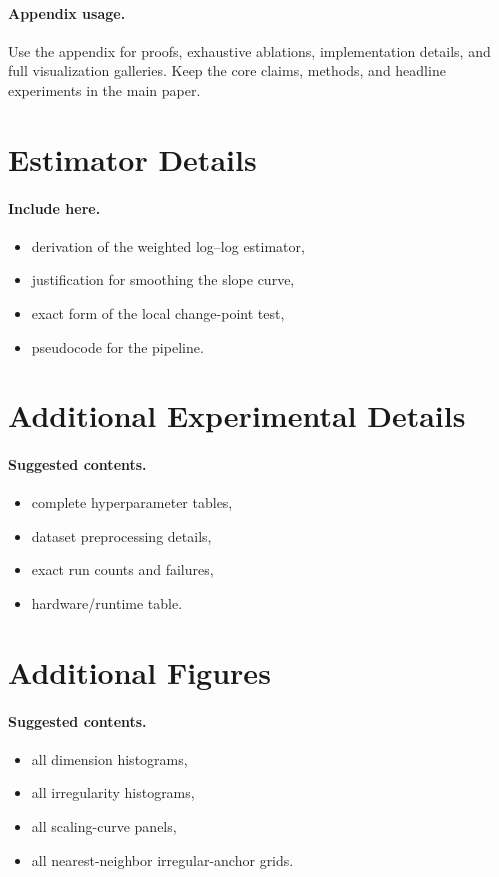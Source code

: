 \documentclass{article}
\theoremstyle{definition}
\theoremstyle{plain}
\theoremstyle{remark}
\begin{document}
\appendix

\paragraph{Appendix usage.}
Use the appendix for proofs, exhaustive ablations, implementation details, and full visualization galleries. Keep the core claims, methods, and headline experiments in the main paper.

\section{Estimator Details}
\paragraph{Include here.}
\begin{itemize}[leftmargin=1.5em]
\item derivation of the weighted log--log estimator,
\item justification for smoothing the slope curve,
\item exact form of the local change-point test,
\item pseudocode for the pipeline.
\end{itemize}

\section{Additional Experimental Details}
\paragraph{Suggested contents.}
\begin{itemize}[leftmargin=1.5em]
\item complete hyperparameter tables,
\item dataset preprocessing details,
\item exact run counts and failures,
\item hardware/runtime table.
\end{itemize}

\section{Additional Figures}
\paragraph{Suggested contents.}
\begin{itemize}[leftmargin=1.5em]
\item all dimension histograms,
\item all irregularity histograms,
\item all scaling-curve panels,
\item all nearest-neighbor irregular-anchor grids.
\end{itemize}
\end{document}
